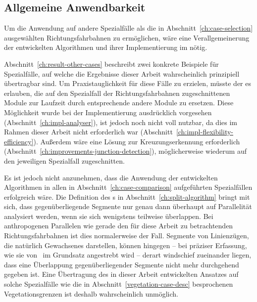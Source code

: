 \documentclass[../main/thesis.tex]{subfiles}
\begin{document}
\subsection{Allgemeine Anwendbarkeit}

Um die Anwendung auf andere Spezialfälle als die in Abschnitt~\ref{ch:case-selection} ausgewählten Richtungsfahrbahnen zu ermöglichen, wäre eine Verallgemeinerung der entwickelten Algorithmen und ihrer Implementierung im  nötig.

Abschnitt~\ref{ch:result-other-cases} beschreibt zwei konkrete Beispiele für Spezialfälle, auf welche die Ergebnisse dieser Arbeit wahrscheinlich prinzipiell übertragbar sind.
Um Praxistauglichkeit für diese Fälle zu erzielen, müsste der  es erlauben, die auf den Spezialfall der Richtungsfahrbahnen zugeschnittenen Module zur Laufzeit durch entsprechende andere Module zu ersetzen.
Diese Möglichkeit wurde bei der Implementierung ausdrücklich vorgesehen (Abschnitt~\ref{ch:impl-analyser}), ist jedoch noch nicht voll nutzbar, da dies im Rahmen dieser Arbeit nicht erforderlich war (Abschnitt~\ref{ch:impl-flexibility-efficiency}).
Außerdem wäre eine Lösung zur Kreuzungserkennung erforderlich (Abschnitt~\ref{ch:improvements-junction-detection}), möglicherweise wiederum auf den jeweiligen Spezialfall zugeschnitten.

Es ist jedoch nicht anzunehmen, dass die Anwendung der entwickelten Algorithmen in allen in Abschnitt~\ref{ch:case-comparison} aufgeführten Spezialfällen erfolgreich wäre.
Die Definition des s in Abschnitt~\ref{ch:split-algorithm} bringt mit sich, dass gegenüberliegende Segmente nur genau dann überhaupt auf Parallelität analysiert werden, wenn sie sich wenigstens teilweise überlappen.
Bei anthropogenen Parallelen wie gerade den für diese Arbeit zu betrachtenden Richtungsfahrbahnen ist dies normalerweise der Fall.
Segmente von Linienzügen, die natürlich Gewachsenes darstellen, können hingegen -- bei präziser Erfassung, wie sie von \osm\ im Grundsatz angestrebt wird -- derart windschief zueinander liegen, dass eine Überlappung gegenüberliegender Segmente nicht mehr durchgehend gegeben ist.
Eine Übertragung des in dieser Arbeit entwickelten Ansatzes auf solche Spezialfälle wie die in Abschnitt~\ref{vegetation-case-desc} besprochenen Vegetationsgrenzen ist deshalb wahrscheinlich unmöglich.

\end{document}
